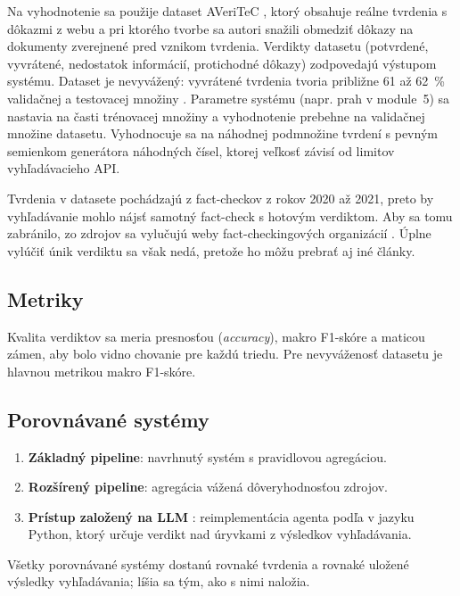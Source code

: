 \documentclass[a4paper,11pt]{article}
\begin{document}
Na vyhodnotenie sa použije dataset AVeriTeC
\cite{schlichtkrull2023averitec}, ktorý obsahuje reálne tvrdenia
s dôkazmi z webu a pri ktorého tvorbe sa autori snažili obmedziť dôkazy
na dokumenty zverejnené pred vznikom tvrdenia. Verdikty datasetu
(potvrdené, vyvrátené, nedostatok informácií, protichodné dôkazy)
zodpovedajú výstupom systému. Dataset je nevyvážený: vyvrátené tvrdenia
tvoria približne 61 až 62~\% validačnej a testovacej množiny
\cite{schlichtkrull2023averitec}. Parametre systému (napr. prah v module~5) sa nastavia na časti trénovacej
množiny a vyhodnotenie prebehne na validačnej množine datasetu. Vyhodnocuje sa na náhodnej podmnožine
tvrdení s pevným semienkom generátora náhodných čísel, ktorej veľkosť
závisí od limitov vyhľadávacieho API.

Tvrdenia v datasete pochádzajú z fact-checkov z rokov 2020 až 2021, preto
by vyhľadávanie mohlo nájsť samotný fact-check s hotovým verdiktom. Aby sa
tomu zabránilo, zo zdrojov sa vylučujú weby fact-checkingových organizácií
\cite{schlichtkrull2023averitec}. Úplne vylúčiť únik verdiktu sa však nedá,
pretože ho môžu prebrať aj iné články.

\subsection{Metriky}

Kvalita verdiktov sa meria presnosťou (\textit{accuracy}), makro
F1-skóre a maticou zámen, aby bolo vidno chovanie pre každú triedu. Pre
nevyváženosť datasetu je hlavnou metrikou makro F1-skóre.

\subsection{Porovnávané systémy}

\begin{enumerate}
  \item \textbf{Základný pipeline}: navrhnutý systém s pravidlovou
        agregáciou.
  \item \textbf{Rozšírený pipeline}: agregácia vážená dôveryhodnosťou
        zdrojov.
  \item \textbf{Prístup založený na LLM} : reimplementácia
        agenta podľa \cite{nath-agent} v jazyku Python, ktorý určuje
        verdikt nad úryvkami z výsledkov vyhľadávania.
\end{enumerate}

Všetky porovnávané systémy dostanú rovnaké tvrdenia a rovnaké uložené
výsledky vyhľadávania; líšia sa tým, ako s nimi naložia.
\end{document}
